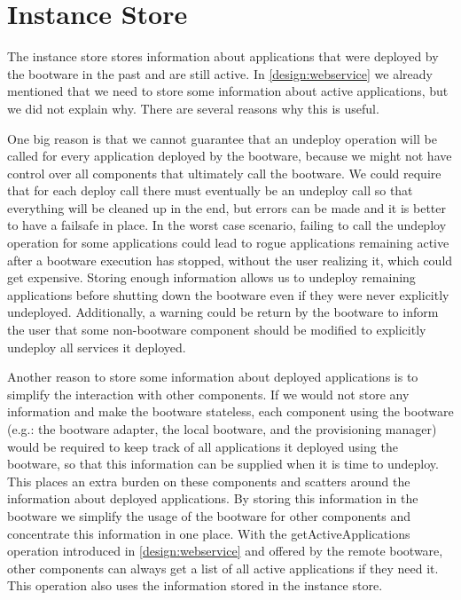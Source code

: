 \section{Instance Store}
\label{design:instancestore}

The instance store stores information about applications that were deployed by the bootware in the past and are still active.
In \autoref{design:webservice} we already mentioned that we need to store some information about active applications, but we did not explain why.
There are several reasons why this is useful.

One big reason is that we cannot guarantee that an undeploy operation will be called for every application deployed by the bootware, because we might not have control over all components that ultimately call the bootware.
We could require that for each deploy call there must eventually be an undeploy call so that everything will be cleaned up in the end, but errors can be made and it is better to have a failsafe in place.
In the worst case scenario, failing to call the undeploy operation for some applications could lead to rogue applications remaining active after a bootware execution has stopped, without the user realizing it, which could get expensive.
Storing enough information allows us to undeploy remaining applications before shutting down the bootware even if they were never explicitly undeployed.
Additionally, a warning could be return by the bootware to inform the user that some non-bootware component should be modified to explicitly undeploy all services it deployed.

Another reason to store some information about deployed applications is to simplify the interaction with other components.
If we would not store any information and make the bootware stateless, each component using the bootware (e.g.: the bootware adapter, the local bootware, and the provisioning manager) would be required to keep track of all applications it deployed using the bootware, so that this information can be supplied when it is time to undeploy.
This places an extra burden on these components and scatters around the information about deployed applications.
By storing this information in the bootware we simplify the usage of the bootware for other components and concentrate this information in one place.
With the getActiveApplications operation introduced in \autoref{design:webservice} and offered by the remote bootware, other components can always get a list of all active applications if they need it.
This operation also uses the information stored in the instance store.

